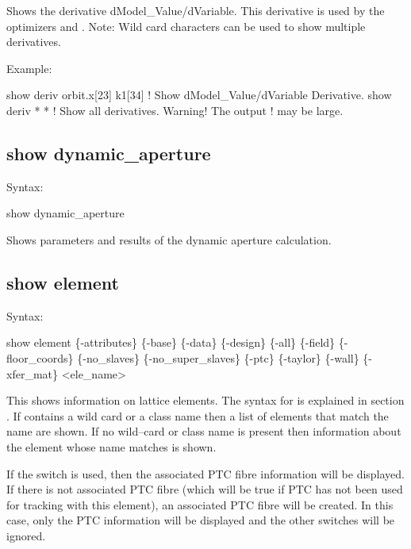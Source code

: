 {{{{{
Shows the derivative dModel_Value/dVariable. This derivative is used by the optimizers
 and . Note: Wild card characters can be used to show multiple derivatives.

Example:
\begin{example}
  show deriv orbit.x[23] k1[34] ! Show dModel_Value/dVariable Derivative.
  show deriv * *                ! Show all derivatives. Warning! The output 
                                ! may be large.
\end{example}


\subsection{show dynamic_aperture}
\label{s:show.dynamic}

Syntax:
\begin{example}
  show dynamic_aperture
\end{example}


Shows parameters and results of the dynamic aperture calculation.


\subsection{show element}
\label{s:show.element}

Syntax:
\begin{example}
  show element \{-attributes\} \{-base\} \{-data\} \{-design\} \{-all\} \{-field\}
      \{-floor_coords\} \{-no_slaves\} \{-no_super_slaves\} \{-ptc\} \{-taylor\} \{-wall\} 
      \{-xfer_mat\} <ele_name>
\end{example}

This shows information on lattice elements. The syntax for  is explained in
section . If  contains a wild card or a class name
then a list of elements that match the name are shown. If no wild--card or class name is
present then information about the element whose name matches  is shown.

If the  switch is used, then the associated PTC fibre information will be
displayed. If there is not associated PTC fibre (which will be true if PTC has not been
used for tracking with this element), an associated PTC fibre will be created. In this
case, only the PTC information will be displayed and the other switches will be ignored.

}}}}}
